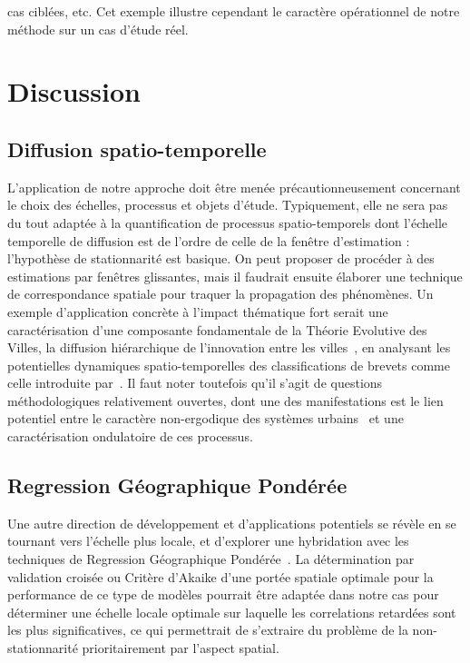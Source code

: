 \documentclass[french]{./sageo}
\begin{document}
cas ciblées, etc. Cet exemple illustre cependant le caractère opérationnel de notre méthode sur un cas d'étude réel.
 







\section{Discussion}


\subsection{Diffusion spatio-temporelle}


L'application de notre approche doit être menée précautionneusement concernant le choix des  échelles, processus et objets d'étude. Typiquement, elle ne sera pas du tout adaptée à la quantification de processus spatio-temporels dont l'échelle temporelle de diffusion est de l'ordre de celle de la fenêtre d'estimation : l'hypothèse de stationnarité est basique. On peut proposer de procéder à des estimations par fenêtres glissantes, mais il faudrait ensuite élaborer une technique de correspondance spatiale pour traquer la propagation des phénomènes. Un exemple d'application concrète à l'impact thématique fort serait une caractérisation d'une composante fondamentale de la Théorie Evolutive des Villes, la diffusion hiérarchique de l'innovation entre les villes~\cite{pumain2010theorie}, en analysant les potentielles dynamiques spatio-temporelles des classifications de brevets comme celle introduite par~\cite{10.1371/journal.pone.0176310}. Il faut noter toutefois qu'il s'agit de questions méthodologiques relativement ouvertes, dont une des manifestations est le lien potentiel entre le caractère non-ergodique des systèmes urbains~\cite{pumain2012urban} et une caractérisation ondulatoire de ces processus.




\subsection{Regression Géographique Pondérée}


Une autre direction de développement et d'applications potentiels se révèle en se tournant vers l'échelle plus locale, et d'explorer une hybridation avec les techniques de Regression Géographique Pondérée~\cite{brunsdon1998geographically}. La détermination par validation croisée ou Critère d'Akaike d'une portée spatiale optimale pour la performance de ce type de modèles pourrait être adaptée dans notre cas pour déterminer une échelle locale optimale sur laquelle les correlations retardées sont les plus significatives, ce qui permettrait de s'extraire du problème de la non-stationnarité prioritairement par l'aspect spatial.
\end{document}
